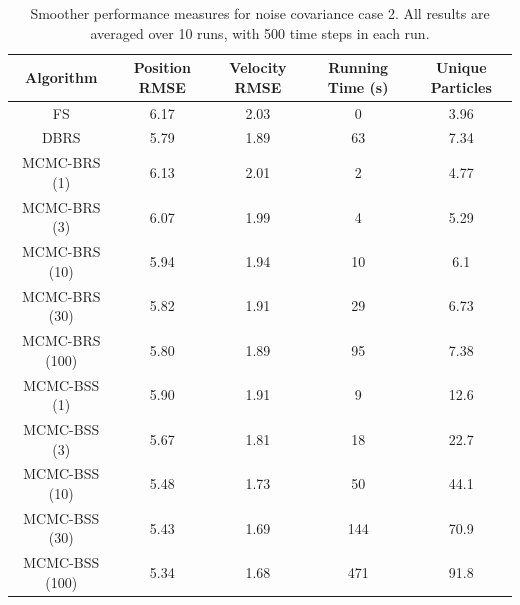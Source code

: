\documentclass[10pt,twocolumn,twoside]{IEEEtran}
\begin{document}
\begin{table}[!t]%
\renewcommand{\arraystretch}{1.3}
\caption{Smoother performance measures for noise covariance case 2. All results are averaged over 10 runs, with 500 time steps in each run.}
\label{tab:case2_performance}
\centering
\begin{tabular}{|c||c|c|c|c|}
\hline
Algorithm & \begin{minipage}[c]{1cm} Position RMSE \end{minipage} & \begin{minipage}[c]{1cm}  Velocity RMSE \end{minipage} & \begin{minipage}[c]{1cm}  Running Time (s) \end{minipage} & \begin{minipage}[c]{1cm}  Unique Particles \end{minipage} \\
\hline
FS 						& 6.17 & 2.03 & 0 & 3.96 \\
DBRS					& 5.79 & 1.89 & 63 & 7.34 \\
\hline
MCMC-BRS (1)	& 6.13 & 2.01 & 2 & 4.77 \\
MCMC-BRS (3)	& 6.07 & 1.99 & 4 & 5.29 \\
MCMC-BRS (10)	& 5.94 & 1.94 & 10 & 6.1 \\
MCMC-BRS (30)	& 5.82 & 1.91 & 29 & 6.73 \\
MCMC-BRS (100)& 5.80 & 1.89 & 95 & 7.38 \\
\hline
MCMC-BSS (1)	& 5.90 & 1.91 & 9 & 12.6 \\
MCMC-BSS (3)	& 5.67 & 1.81 & 18 & 22.7 \\
MCMC-BSS (10)	& 5.48 & 1.73 & 50 & 44.1 \\
MCMC-BSS (30)	& 5.43 & 1.69 & 144 & 70.9 \\
MCMC-BSS (100)& 5.34 & 1.68 & 471 & 91.8 \\
\hline
\end{tabular}
\end{table}
\end{document}
